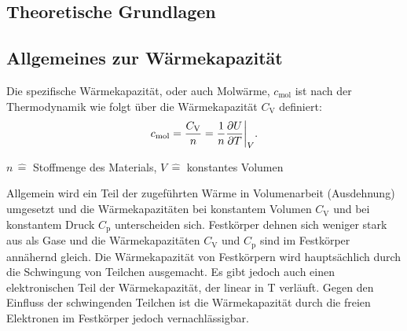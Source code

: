 \subsection{Theoretische Grundlagen}
\subsection{Allgemeines zur Wärmekapazität}
Die spezifische Wärmekapazität, oder auch Molwärme, $c_{\text{mol}}$ ist nach der Thermodynamik wie folgt über die Wärmekapazität $C_{\text{V}}$ definiert:
\begin{equation*}
	c_{\text{mol}} = \frac{C_{\text{V}}}{n} = \frac{1}{n} \frac{\partial U}{\partial T} \bigg{\vert}_{V}.
\end{equation*}
\begin{center}
	\tiny{$n \, \widehat{=}$ Stoffmenge des Materials, $V \, \widehat{=}$ konstantes Volumen }
\end{center}
Allgemein wird ein Teil der zugeführten Wärme in Volumenarbeit (Ausdehnung) umgesetzt und die Wärmekapazitäten bei konstantem Volumen $C_{\text{V}}$ und bei konstantem Druck $C_{\text{p}}$ unterscheiden sich.
Festkörper dehnen sich weniger stark aus als Gase und die Wärmekapazitäten $C_{\text{V}}$ und $C_{\text{p}}$ sind im Festkörper annähernd gleich.
Die Wärmekapazität von Festkörpern wird hauptsächlich durch die Schwingung von Teilchen ausgemacht.
Es gibt jedoch auch einen elektronischen Teil der Wärmekapazität, der linear in T verläuft.
Gegen den Einfluss der schwingenden Teilchen ist die Wärmekapazität durch die freien Elektronen im Festkörper jedoch vernachlässigbar.

